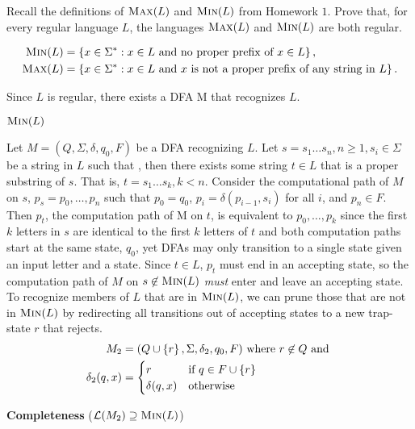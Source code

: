 \begin{problem}
  Recall the definitions of $\textsc{Max}(L)$ and $\textsc{Min}(L)$ from Homework $1$.
  Prove that, for every regular language $L$, the languages
  $\textsc{Max}(L)$ and $\textsc{Min}(L)$ are both regular.

  \step
  \begin{align*}
    \textsc{Min}(L) &= \set{x \in \Sigma^* : x \in L \text{ and no proper prefix of } x \in L},\\
    \textsc{Max}(L) &= \set{x \in \Sigma^* : x \in L \text{ and $x$ is not a proper prefix of any string in $L$}}.
  \end{align*}
  \begin{Answer}
    Since $L$ is regular, there exists a DFA M that recognizes $L$.
    \begin{enumalph}
      \newpage
      \item $\textsc{Min}(L)$
      
      \step
        Let $M = (Q, \Sigma, \delta, q_0, F)$ be a DFA recognizing $L$.
        Let $s = s_1\ldots s_n, n \ge 1, s_i \in \Sigma$ be a string in $L$
        such that ,
        then there exists some string $t \in L$ that is a proper substring of $s$.
        That is, $t = s_1 \ldots s_k, k < n$.
        Consider the computational path of $M$ on $s$,
        $p_s = p_0,\ldots, p_n$ such that $p_0 = q_0$,
        $p_i = \delta(p_{i-1}, s_i)$ for all $i$, and $p_n \in F$.
        Then $p_t$, the computation path of M on $t$,
        is equivalent to $p_0, \ldots, p_k$
        since the first $k$ letters in $s$ are identical to the first $k$ letters of $t$
        and both computation paths start at the same state, $q_0$, yet DFAs may only transition
        to a single state given an input letter and a state.
        Since $t \in L$, $p_t$ must end in an accepting state,
        so the computation path of $M$ on $s \notin \textsc{Min}(L)$
        \emph{must} enter and leave an accepting state.
        To recognize members of $L$ that are in $\textsc{Min}(L)$,
        we can prune those that are not in $\textsc{Min}(L)$ by redirecting
        all transitions out of accepting states to a new trap-state $r$
        that rejects.
        \begin{align*}
          M_2 &= (Q \cup \set{r}, \Sigma, \delta_2, q_0, F) \text{ where $r \notin Q$ and }\\
          \delta_2(q, x) &= \begin{cases}
            r & \text{if $q \in F \cup \set{r}$ } \\
            \delta(q, x) & \text{otherwise } \\
          \end{cases}
        \end{align*}
        \begin{enumroman}
          \item \textbf{Completeness} ($\calL(M_2) \supseteq \textsc{Min}(L)$)
            

\end{enumroman}
\end{enumalph}
\end{Answer}
\end{problem}
